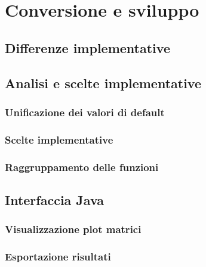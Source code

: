 \chapter{Conversione e sviluppo}

\section{Differenze implementative}

\section{Analisi e scelte implementative}
\subsection{Unificazione dei valori di default}
\subsection{Scelte implementative}
\subsection{Raggruppamento delle funzioni}

\section{Interfaccia Java}
\subsection{Visualizzazione plot matrici}
\subsection{Esportazione risultati}
